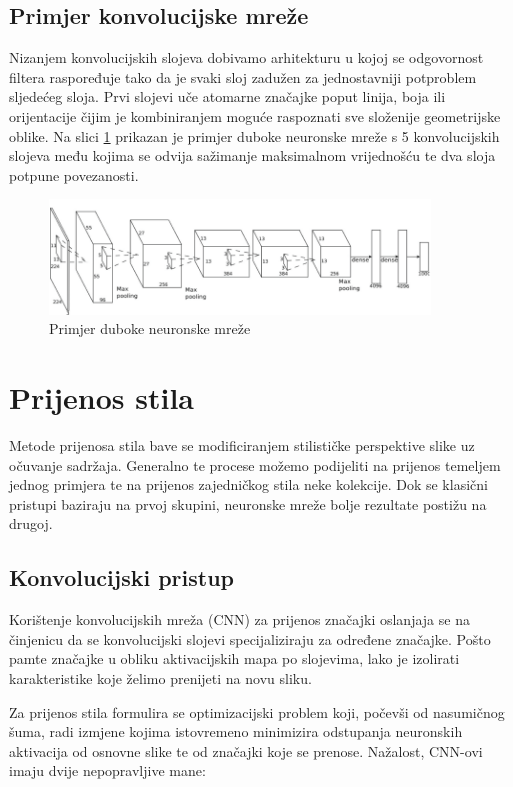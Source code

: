 \documentclass[lmodern, utf8, seminar]{fer}
\begin{document}
\section{Primjer konvolucijske mreže}
Nizanjem konvolucijskih slojeva dobivamo arhitekturu u kojoj se odgovornost filtera raspoređuje tako da je svaki sloj zadužen za jednostavniji potproblem sljedećeg sloja. Prvi slojevi uče atomarne značajke poput linija, boja ili orijentacije čijim je kombiniranjem moguće raspoznati sve složenije geometrijske oblike. Na slici \ref{fig:dnn} prikazan je primjer duboke neuronske mreže s 5 konvolucijskih slojeva među kojima se odvija sažimanje maksimalnom vrijednošću te dva sloja potpune povezanosti.
\newline

\begin{figure}[H]
    \centering
    \includegraphics[width=0.9\textwidth]{dnn}
    \caption{Primjer duboke neuronske mreže}
    \label{fig:dnn}
\end{figure}




\chapter{Prijenos stila}
Metode prijenosa stila bave se modificiranjem stilističke perspektive slike uz očuvanje sadržaja. Generalno te procese možemo podijeliti na prijenos temeljem jednog primjera te na prijenos zajedničkog stila neke kolekcije. Dok se klasični pristupi baziraju na prvoj skupini, neuronske mreže bolje rezultate postižu na drugoj. 

\section{Konvolucijski pristup}
Korištenje konvolucijskih mreža (CNN) za prijenos značajki oslanjaja se na činjenicu da se konvolucijski slojevi specijaliziraju za određene značajke. Pošto pamte značajke u obliku aktivacijskih mapa po slojevima, lako je izolirati karakteristike koje želimo prenijeti na novu sliku. 

Za prijenos stila formulira se optimizacijski problem koji, počevši od nasumičnog šuma, radi izmjene kojima istovremeno minimizira odstupanja neuronskih aktivacija od osnovne slike te od značajki koje se prenose. Nažalost, CNN-ovi imaju dvije nepopravljive mane:
\end{document}
